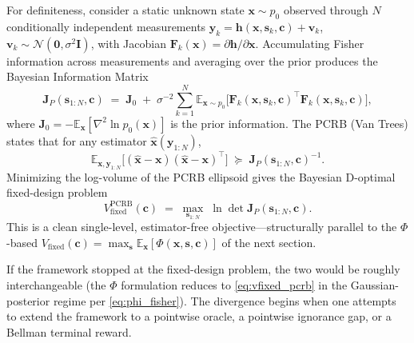 \documentclass[11pt,a4paper]{article}
\newcommand{\E}{\mathbb{E}}
\begin{document}
For definiteness, consider a static unknown state $\bm{x} \sim p_0$ observed through $N$ conditionally independent measurements $\bm{y}_k = \bm{h}(\bm{x}, \bm{s}_k, \bm{c}) + \bm{v}_k$, $\bm{v}_k \sim \mathcal{N}(\bm{0}, \sigma^2 \bm{I})$, with Jacobian $\bm{F}_k(\bm{x}) = \partial\bm{h}/\partial\bm{x}$.  Accumulating Fisher information across measurements and averaging over the prior produces the Bayesian Information Matrix
\begin{equation}
  \bm{J}_P(\bm{s}_{1:N}, \bm{c}) \;=\; \bm{J}_0 \;+\; \sigma^{-2}\sum_{k=1}^N \E_{\bm{x} \sim p_0}\!\bigl[\bm{F}_k(\bm{x}, \bm{s}_k, \bm{c})^\top \bm{F}_k(\bm{x}, \bm{s}_k, \bm{c})\bigr],
  \label{eq:JP}
\end{equation}
where $\bm{J}_0 = -\E_{\bm{x}}[\nabla^2 \ln p_0(\bm{x})]$ is the prior information.  The PCRB (Van Trees) states that for any estimator $\hat{\bm{x}}(\bm{y}_{1:N})$,
\begin{equation}
  \E_{\bm{x}, \bm{y}_{1:N}}\!\bigl[(\hat{\bm{x}} - \bm{x})(\hat{\bm{x}} - \bm{x})^\top\bigr] \;\succeq\; \bm{J}_P(\bm{s}_{1:N}, \bm{c})^{-1}.
  \label{eq:pcrb_ineq}
\end{equation}
Minimizing the log-volume of the PCRB ellipsoid gives the Bayesian D-optimal fixed-design problem
\begin{equation}
  V^{\mathrm{PCRB}}_{\mathrm{fixed}}(\bm{c}) \;=\; \max_{\bm{s}_{1:N}}\; \ln\det \bm{J}_P(\bm{s}_{1:N}, \bm{c}).
  \label{eq:vfixed_pcrb}
\end{equation}
This is a clean single-level, estimator-free objective---structurally parallel to the $\Phi$-based $V_{\mathrm{fixed}}(\bm{c}) = \max_{\bm{s}} \E_{\bm{x}}[\Phi(\bm{x}, \bm{s}, \bm{c})]$ of the next section.

If the framework stopped at the fixed-design problem, the two would be roughly interchangeable (the $\Phi$ formulation reduces to \eqref{eq:vfixed_pcrb} in the Gaussian-posterior regime per \eqref{eq:phi_fisher}).  The divergence begins when one attempts to extend the framework to a pointwise oracle, a pointwise ignorance gap, or a Bellman terminal reward.
\end{document}
